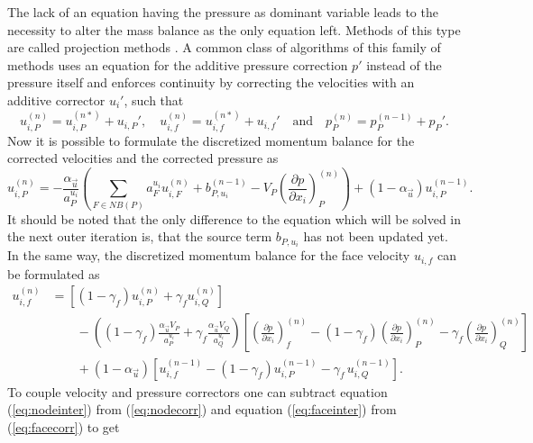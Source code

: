 The lack of an equation having the pressure as dominant variable leads to the necessity to alter the mass balance as the only equation left. Methods of this type are called projection methods \cite{ferziger02}. A common class of algorithms of this family of methods uses an equation for the additive pressure correction \(p'\) instead of the pressure itself and enforces continuity by correcting the velocities with an additive corrector \(u_i'\), such that
\begin{displaymath}
  u_{i,P}^{(n)} =  u_{i,P}^{(n*)}  + u_{i,P}',\quad u_{i,f}^{(n)} =  u_{i,f}^{(n*)}  + u_{i,f}' \quad \text{and} \quad   p_P^{(n)} =  p_P^{(n-1)}  + p_P'.
\end{displaymath}
Now it is possible to formulate the discretized momentum balance for the corrected velocities and the corrected pressure as
\begin{equation}
  \label{eq:nodecorr}
  u_{i,P}^{(n)} 
  = 
  - \frac{\alpha_{\vec{u}}}{a_P^{u_i}} \left(\sum_{F \in NB(P)} a_F^{u_i} u_{i,F}^{(n)}
  +                                     b_{P,u_i}^{(n-1)} 
  -                                     V_P\left(\frac{\partial p}{\partial x_i}\right)_P^{(n)} \right)
  + \left(1 - \alpha_{\vec{u}}\right) u_{i,P}^{(n-1)}.
\end{equation}
It should be noted that the only difference to the equation which will be solved in the next outer iteration is, that the source term \(b_{P,u_i}\) has not been updated yet. In the same way, the discretized momentum balance for the face velocity \(u_{i,f}\) can be formulated as
\begin{align}
  \label{eq:facecorr}
  u_{i,f}^{(n)} 
  &=
  \left[\left(1 - \gamma_f\right) u_{i,P}^{(n)} + \gamma_f u_{i,Q}^{(n)} \right] \nonumber\\[1em]
  &\quad\quad - 
  \left(\left(1 - \gamma_f\right) \frac{\alpha_\vec{u} V_P}{a_P^{u_i}} + \gamma_f \frac{\alpha_\vec{u} V_Q}{a_Q^{u_i}}\right)
  \left[ 
  \left(\frac{\partial p}{\partial x_i}\right)_f^{(n)} 
  -  \left(1 - \gamma_f\right) \left( \frac{\partial p}{\partial x_i} \right)_P^{(n)} 
  - \gamma_f \left(\frac{\partial p}{\partial x_i}\right)_Q^{(n)} 
  \right] \nonumber \\[1em]
  &\quad\quad + \left(1 - \alpha_\vec{u}\right) \left[ u_{i,f}^{(n-1)} - \left(1 - \gamma_f\right) u_{i,P}^{(n-1)} - \gamma_f \, u_{i,Q}^{(n-1)} \right].
\end{align}
To couple velocity and pressure correctors one can subtract equation (\ref{eq:nodeinter}) from (\ref{eq:nodecorr}) and equation (\ref{eq:faceinter}) from (\ref{eq:facecorr}) to get
